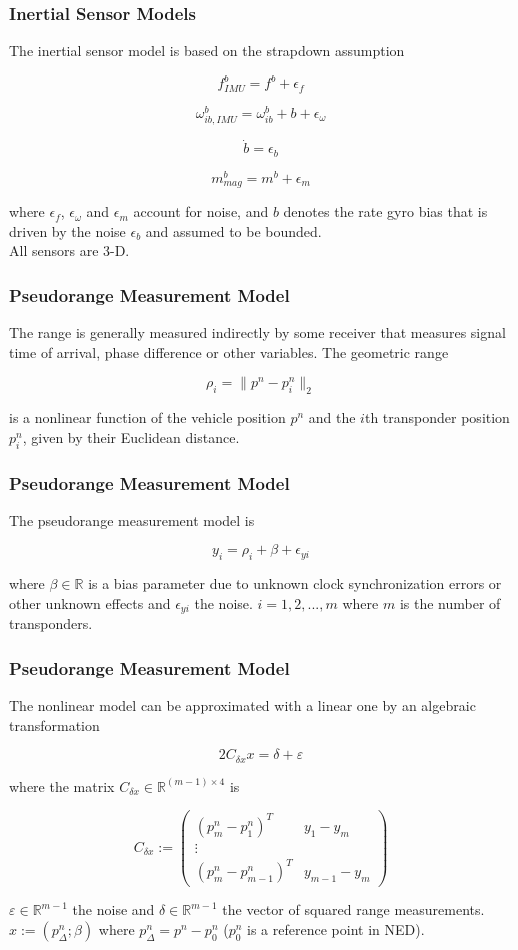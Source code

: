\documentclass{beamer}
\begin{document}
	\begin{frame}
	\frametitle{Inertial Sensor Models}
	The inertial sensor model is based on the strapdown assumption
	
	\[ f^b_{IMU} = f^b + \epsilon_f\]
	
	\[ \omega^b_{ib,IMU} = \omega^b_{ib} + b + \epsilon_\omega \]
	
	\[ \dot{b} = \epsilon_b \]
	
	\[ m^b_{mag} = m^b + \epsilon_m \]
	
	where $\epsilon_f$, $\epsilon_\omega$ and $\epsilon_m$ account for noise, and $b$ denotes the rate gyro bias that is driven by the noise $\epsilon_b$ and assumed to be bounded.  
	\\ All sensors are 3-D.
	\end{frame}

	\begin{frame}
	\frametitle{Pseudorange Measurement Model}
	The range is generally measured indirectly by some receiver that measures signal time of arrival, phase difference or other variables. The geometric range 
	
	\[ \rho_i = \|p^n - p^n_i\|_2 \]
	
	is a nonlinear function of the vehicle position $p^n$ and the $i$th transponder position $p^n_i$, given by their Euclidean distance.
	\end{frame}
	
	\begin{frame}
		\frametitle{Pseudorange Measurement Model}
		The pseudorange measurement model is
		
		\[ y_i = \rho_i + \beta + \epsilon_{yi} \]
		
		where $\beta \in \mathds{R}$ is a bias parameter due to unknown clock synchronization errors or other unknown effects and $\epsilon_{yi}$ the noise.
		$i = 1,2,...,m$ where $m$ is the number of transponders.
	\end{frame}
	
	\begin{frame}
	\frametitle{Pseudorange Measurement Model}
	The nonlinear model can be approximated with a linear one by an algebraic transformation 
	
		\[ 2C_{\delta x}x = \delta + \varepsilon  \]
		
	where the matrix $C_{\delta x} \in \mathds{R}^{(m-1)\times4}$ is
	
	$$
	C_{\delta x} :=
	\begin{pmatrix}
	(p^n_m - p^n_1)^T & y_1 - y_m \\
	\vdots \\
	(p^n_m - p^n_{m-1})^T & y_{m-1} - y_m 
	\end{pmatrix} 
	$$
	
	$\varepsilon \in \mathds{R}^{m-1}$ the noise and $\delta \in \mathds{R}^{m-1}$ the vector of squared range measurements. \\ $x := (p^n_\Delta;\beta)$ where $p_\Delta^n = p^n - p^n_0$ ($p_0^n$ is a reference point in NED). 
	\end{frame}
\end{document}
